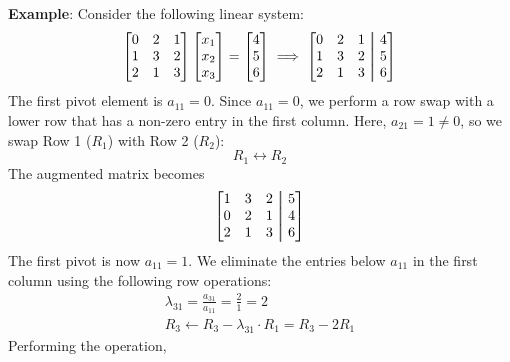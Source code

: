 \begin{exampleBox}
    \textbf{Example}: Consider the following linear system:
    \begin{equation*}
        \begin{bmatrix}
            0 & 2 & 1 \\
            1 & 3 & 2 \\
            2 & 1 & 3
        \end{bmatrix}
        \begin{bmatrix}
            x_1 \\ x_2 \\ x_3
        \end{bmatrix}
        =
        \begin{bmatrix}
            4 \\ 5 \\ 6
        \end{bmatrix}
        \implies
        \begin{bmatrix}
            0 & 2 & 1 &\aug& 4 \\
            1 & 3 & 2 &\aug& 5 \\
            2 & 1 & 3 &\aug& 6
        \end{bmatrix}
    \end{equation*}
    The first pivot element is $ a_{11} = 0 $. Since $ a_{11} = 0 $, we perform a row swap with a lower row that has a non-zero entry in the first column. Here, $ a_{21} = 1 \neq 0 $, so we swap Row 1 ($ R_1 $) with Row 2 ($ R_2 $):
    \begin{equation*}
        R_1 \leftrightarrow R_2
    \end{equation*}
    The augmented matrix becomes
    \begin{equation*}
        \begin{bmatrix}
            1 & 3 & 2 &\aug& 5 \\
            0 & 2 & 1 &\aug& 4 \\
            2 & 1 & 3 &\aug& 6
        \end{bmatrix}
    \end{equation*}
    The first pivot is now $ a_{11} = 1 $. We eliminate the entries below $ a_{11} $ in the first column using the following row operations:
    \begin{gather*}
        \lambda_{31} = \frac{a_{31}}{a_{11}} = \frac{2}{1} = 2 \\
        R_3 \leftarrow R_3 - \lambda_{31} \cdot R_1 = R_3 - 2R_1
    \end{gather*}
    Performing the operation,

\end{exampleBox}
